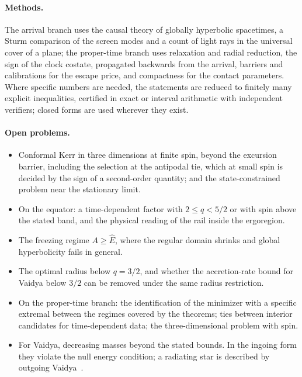 \documentclass[aip,jmp,amsmath,amssymb,reprint]{revtex4-2}
\newcommand{\Ehat}{\hat E}
\theoremstyle{plain}
\theoremstyle{definition}
\begin{document}
\paragraph{Methods.} The arrival branch uses the causal theory of globally hyperbolic spacetimes, a Sturm
comparison of the screen modes and a count of light rays in the universal cover of a plane; the
proper-time branch uses relaxation and radial reduction, the sign of the clock costate, propagated
backwards from the arrival, barriers and calibrations for the escape price, and compactness for the contact parameters.
Where specific numbers are needed, the statements are reduced to finitely many explicit inequalities,
certified in exact or interval arithmetic with independent verifiers; closed forms are used wherever
they exist.

\paragraph{Open problems.}
\begin{itemize}
\item Conformal Kerr in three dimensions at finite spin, beyond the excursion barrier, including the
  selection at the antipodal tie, which at small spin is decided by the sign of a second-order
  quantity; and the state-constrained problem near the stationary limit.
\item On the equator: a time-dependent factor with $2\le q<5/2$ or with spin above the stated band, and
  the physical reading of the rail inside the ergoregion.
\item The freezing regime $A\ge\Ehat$, where the regular domain shrinks and global hyperbolicity fails in
  general.
\item The optimal radius below $q=3/2$, and whether the accretion-rate bound for Vaidya below $3/2$ can be
  removed under the same radius restriction.
\item On the proper-time branch: the identification of the minimizer with a specific extremal between
  the regimes covered by the theorems; ties between interior candidates for time-dependent data; the
  three-dimensional problem with spin.
\item For Vaidya, decreasing masses beyond the stated bounds. In the ingoing form they violate the null
  energy condition; a radiating star is described by outgoing Vaidya~\cite{Vaidya1951,LindquistSchwartzMisner1965}.
\end{itemize}
\end{document}
